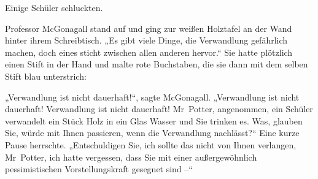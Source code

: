 Einige Schüler schluckten. 

Professor McGonagall stand auf und ging zur weißen Holztafel an der Wand hinter ihrem Schreibtisch. „Es gibt viele Dinge, die Verwandlung gefährlich machen, doch eines sticht zwischen allen anderen hervor.“ Sie hatte plötzlich einen Stift in der Hand und malte rote Buchstaben, die sie dann mit dem selben Stift blau unterstrich: 



„Verwandlung ist nicht dauerhaft!“, sagte McGonagall. „Verwandlung ist nicht dauerhaft! Verwandlung ist nicht dauerhaft! Mr~Potter, angenommen, ein Schüler verwandelt ein Stück Holz in ein Glas Wasser und Sie trinken es. Was, glauben Sie, würde mit Ihnen passieren, wenn die Verwandlung nachlässt?“ Eine kurze Pause herrschte. „Entschuldigen Sie, ich sollte das nicht von Ihnen verlangen, Mr~Potter, ich hatte vergessen, dass Sie mit einer außergewöhnlich pessimistischen Vorstellungskraft gesegnet sind –“ 

